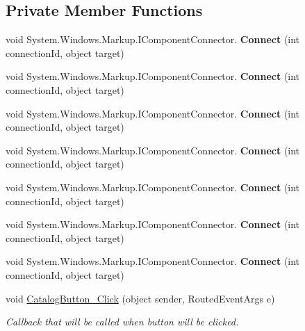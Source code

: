 \subsection*{Private Member Functions}
\begin{DoxyCompactItemize}
\item 
\mbox{\label{class_teacher_handbook_1_1_controls_1_1_catalog_button_aee1606053e8ffdb900fd8cb3f1d71bd4}} 
void System.\+Windows.\+Markup.\+I\+Component\+Connector. {\bfseries Connect} (int connection\+Id, object target)
\item 
\mbox{\label{class_teacher_handbook_1_1_controls_1_1_catalog_button_aee1606053e8ffdb900fd8cb3f1d71bd4}} 
void System.\+Windows.\+Markup.\+I\+Component\+Connector. {\bfseries Connect} (int connection\+Id, object target)
\item 
\mbox{\label{class_teacher_handbook_1_1_controls_1_1_catalog_button_aee1606053e8ffdb900fd8cb3f1d71bd4}} 
void System.\+Windows.\+Markup.\+I\+Component\+Connector. {\bfseries Connect} (int connection\+Id, object target)
\item 
\mbox{\label{class_teacher_handbook_1_1_controls_1_1_catalog_button_aee1606053e8ffdb900fd8cb3f1d71bd4}} 
void System.\+Windows.\+Markup.\+I\+Component\+Connector. {\bfseries Connect} (int connection\+Id, object target)
\item 
\mbox{\label{class_teacher_handbook_1_1_controls_1_1_catalog_button_aee1606053e8ffdb900fd8cb3f1d71bd4}} 
void System.\+Windows.\+Markup.\+I\+Component\+Connector. {\bfseries Connect} (int connection\+Id, object target)
\item 
\mbox{\label{class_teacher_handbook_1_1_controls_1_1_catalog_button_aee1606053e8ffdb900fd8cb3f1d71bd4}} 
void System.\+Windows.\+Markup.\+I\+Component\+Connector. {\bfseries Connect} (int connection\+Id, object target)
\item 
\mbox{\label{class_teacher_handbook_1_1_controls_1_1_catalog_button_aee1606053e8ffdb900fd8cb3f1d71bd4}} 
void System.\+Windows.\+Markup.\+I\+Component\+Connector. {\bfseries Connect} (int connection\+Id, object target)
\item 
void \mbox{\hyperlink{class_teacher_handbook_1_1_controls_1_1_catalog_button_ab6fdcafe2b97c645486d1ca83109c979}{Catalog\+Button\+\_\+\+Click}} (object sender, Routed\+Event\+Args e)
\begin{DoxyCompactList}\small\item\em Callback that will be called when button will be clicked. \end{DoxyCompactList}\end{DoxyCompactItemize}
